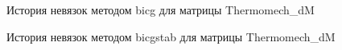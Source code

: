 \begin{figure}[H]
    \renewcommand{\figurename}{Рисунок}
    \caption{История невязок методом bicg для матрицы Thermomech_dM}
    \label{fig:image_23}
\end{figure}

\begin{figure}[H]
    \renewcommand{\figurename}{Рисунок}
    \caption{История невязок методом bicgstab для матрицы Thermomech_dM}
    \label{fig:image_24}
\end{figure}

